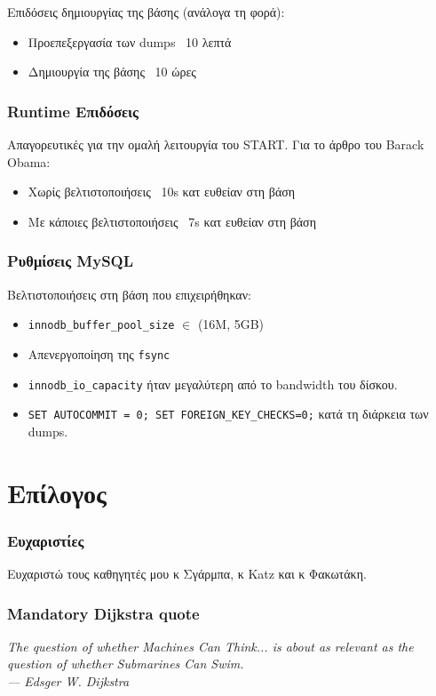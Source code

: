 \documentclass[bigger]{beamer}
\begin{document}
\begin{frame}
  Επιδόσεις δημιουργίας της βάσης (ανάλογα τη φορά):

  \begin{itemize}
  \item Προεπεξεργασία των dumps ~10 λεπτά
  \item Δημιουργία της βάσης ~10 ώρες
  \end{itemize}
\end{frame}

\begin{frame}
  \frametitle{Runtime Επιδόσεις}

  Απαγορευτικές για την ομαλή λειτουργία του START. Για το άρθρο του
  Barack Obama:
  \begin{itemize}
  \item Χωρίς βελτιστοποιήσεις ~10s κατ ευθείαν στη βάση
  \item Με κάποιες βελτιστοποιήσεις ~7s κατ ευθείαν στη βάση
  \end{itemize}
\end{frame}

\begin{frame}
  \frametitle{Ρυθμίσεις MySQL}

  Βελτιστοποιήσεις στη βάση που επιχειρήθηκαν:

  \begin{itemize}
  \item \texttt{innodb\_buffer\_pool\_size} \(\in\) (16Μ, 5GB)
  \item Απενεργοποίηση της \texttt{fsync}
  \item \texttt{innodb\_io\_capacity} ήταν μεγαλύτερη από το bandwidth
    του δίσκου.
  \item \texttt{SET AUTOCOMMIT = 0; SET FOREIGN\_KEY\_CHECKS=0;} κατά τη
    διάρκεια των dumps.
  \end{itemize}
\end{frame}

\section{Επίλογος}

\begin{frame}
  \frametitle{Ευχαριστίες}

  Ευχαριστώ τους καθηγητές μου κ Σγάρμπα, κ Katz και κ Φακωτάκη.

\end{frame}

\begin{frame}
  \frametitle{Mandatory Dijkstra quote}

  \vfill
  \textit{The question of whether Machines Can Think... is about as relevant as the question of whether Submarines Can Swim.\\
  \hfill --- Edsger W. Dijkstra}
  \vfill

\end{frame}
\end{document}
